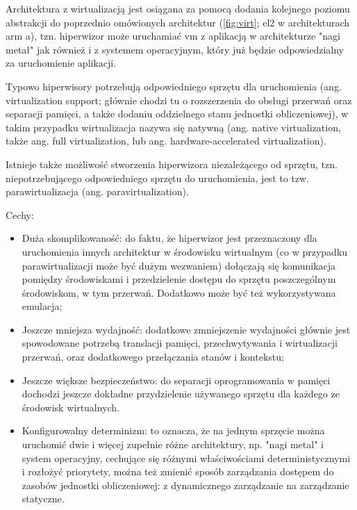 \documentclass[../../main]{subfiles}
\begin{document}
Architektura z wirtualizacją jest osiągana za pomocą dodania kolejnego poziomu abstrakcji do
poprzednio omówionych architektur (\cref{fig:virt}; \acrshort{el}2 w architekturach
\acrshort{arm} \acrshort{a}), tzn. hiperwizor może uruchamiać \acrshort{vm} z aplikacją w architekturze "nagi
metał" jak również i z systemem operacyjnym, który już będzie odpowiedzialny za uruchomienie aplikacji.

Typowo hiperwisory potrzebują odpowiedniego sprzętu dla uruchomienia (ang. virtualization support;
głównie chodzi tu o rozszerzenia do obsługi przerwań oraz separacji pamięci, a także dodaniu
oddzielnego stanu jednostki obliczeniowej), w takim przypadku wirtualizacja nazywa się natywną (ang.
native virtualization, także ang. full virtualization, lub ang. hardware-accelerated virtualization).

Istnieje także możliwość stworzenia hiperwizora niezależącego od sprzętu, tzn. niepotrzebującego
odpowiedniego sprzętu do uruchomienia, jest to tzw. parawirtualizacja (ang. paravirtualization).

Cechy:
\begin{itemize}
    \item Duża skomplikowaność: do faktu, że hiperwizor jest przeznaczony dla uruchomienia innych
    architektur w środowisku wirtualnym (co w przypadku parawirtualizacji może być dużym wezwaniem)
    dołączają się komunikacja pomiędzy środowiskami i przedzielenie dostępu do sprzętu poszczególnym
    środowiskom, w tym przerwań. Dodatkowo może być też wykorzystywana emulacja;
    \item Jeszcze mniejsza wydajność: dodatkowe zmniejszenie wydajności głównie jest spowodowane
    potrzebą translacji pamięci, przechwytywania i wirtualizacji przerwań, oraz dodatkowego
    przełączania stanów i kontekstu;
    \item Jeszcze większe bezpieczeństwo: do separacji oprogramowania w pamięci dochodzi jeszcze
    dokładne przydzielenie używanego sprzętu dla każdego ze środowisk wirtualnych.
    \item Konfigurowalny determinizm: to oznacza, że na jednym sprzęcie można uruchomić dwie i więcej
    zupełnie różne architektury, np. "nagi metal" i system operacyjny, cechujące się różnymi
    właściwościami deterministycznymi i rozłożyć priorytety, można też zmienić sposób zarządzania
    dostępem do zasobów jednostki obliczeniowej: z dynamicznego zarządzanie na zarządzanie statyczne.
\end{itemize}
\end{document}
